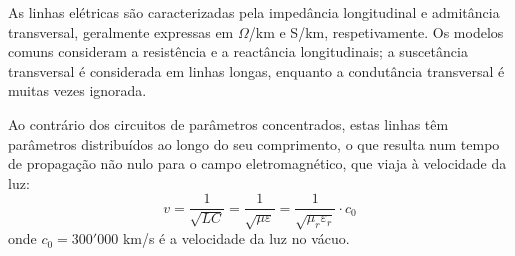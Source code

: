 As linhas elétricas são caracterizadas pela impedância longitudinal e admitância transversal, geralmente expressas em $\Omega$/km e S/km, respetivamente. Os modelos comuns consideram a resistência e a reactância longitudinais; a suscetância transversal é considerada em linhas longas, enquanto a condutância transversal é muitas vezes ignorada. 

\begin{mdframed}
    Ao contrário dos circuitos de parâmetros concentrados, estas linhas têm parâmetros distribuídos ao longo do seu comprimento, o que resulta num tempo de propagação não nulo para o campo eletromagnético, que viaja à velocidade da luz:
    $$
        v = \frac{1}{\sqrt{LC}} = \frac{1}{\sqrt{\mu \varepsilon}} = \frac{1}{\sqrt{\mu_r \varepsilon_r}} \cdot c_0
    $$
    onde $c_0 = 300'000$ km/s é a velocidade da luz no vácuo.
\end{mdframed}

